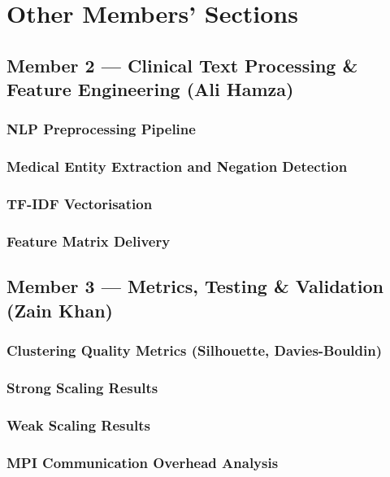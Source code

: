 \documentclass[12pt,a4paper]{article}
\begin{document}
\section{Other Members' Sections}

\subsection*{Member 2 --- Clinical Text Processing \& Feature Engineering (Ali Hamza)}
\subsubsection*{NLP Preprocessing Pipeline}
\subsubsection*{Medical Entity Extraction and Negation Detection}
\subsubsection*{TF-IDF Vectorisation}
\subsubsection*{Feature Matrix Delivery}

\vspace{2em}
\subsection*{Member 3 --- Metrics, Testing \& Validation (Zain Khan)}
\subsubsection*{Clustering Quality Metrics (Silhouette, Davies-Bouldin)}
\subsubsection*{Strong Scaling Results}
\subsubsection*{Weak Scaling Results}
\subsubsection*{MPI Communication Overhead Analysis}
\end{document}
